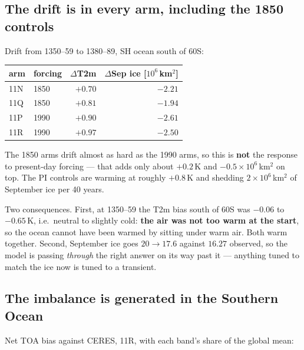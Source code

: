 \documentclass[10pt]{article}
\begin{document}
\subsection{The drift is in every arm, including the 1850 controls}\label{sub:r33drift}

Drift from 1350--59 to 1380--89, SH ocean south of 60S:

\begin{center}\small
\begin{tabular}{llrr}
\toprule
arm & forcing & $\Delta$T2m & $\Delta$Sep ice [$10^6$\,km$^2$] \\
\midrule
11N & 1850 & $+0.70$ & $-2.21$ \\
11Q & 1850 & $+0.81$ & $-1.94$ \\
11P & 1990 & $+0.90$ & $-2.61$ \\
11R & 1990 & $+0.97$ & $-2.50$ \\
\bottomrule
\end{tabular}
\end{center}

The 1850 arms drift almost as hard as the 1990 arms, so this is \textbf{not} the response
to present-day forcing --- that adds only about $+0.2$\,K and $-0.5\times10^6$\,km$^2$ on
top. The PI controls are warming at roughly $+0.8$\,K and shedding
$2\times10^6$\,km$^2$ of September ice per 40 years.

Two consequences. First, at 1350--59 the T2m bias south of 60S was $-0.06$ to $-0.65$\,K,
i.e.\ neutral to slightly cold: \textbf{the air was not too warm at the start}, so the
ocean cannot have been warmed by sitting under warm air. Both warm together. Second,
September ice goes $20\to17.6$ against $16.27$ observed, so the model is passing
\emph{through} the right answer on its way past it --- anything tuned to match the ice
now is tuned to a transient.

\subsection{The imbalance is generated in the Southern Ocean}\label{sub:r33toa}

Net TOA bias against CERES, 11R, with each band's share of the global mean:
\end{document}
